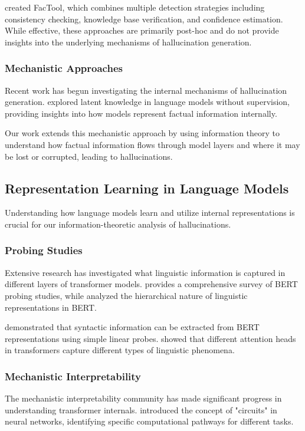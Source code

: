 \citet{chern2023factool} created FacTool, which combines multiple detection strategies including consistency checking, knowledge base verification, and confidence estimation. While effective, these approaches are primarily post-hoc and do not provide insights into the underlying mechanisms of hallucination generation.

\subsubsection{Mechanistic Approaches}
Recent work has begun investigating the internal mechanisms of hallucination generation. \citet{burns2023discovering} explored latent knowledge in language models without supervision, providing insights into how models represent factual information internally.

Our work extends this mechanistic approach by using information theory to understand how factual information flows through model layers and where it may be lost or corrupted, leading to hallucinations.

\subsection{Representation Learning in Language Models}
\label{subsec:repr_learning_lm}

Understanding how language models learn and utilize internal representations is crucial for our information-theoretic analysis of hallucinations.

\subsubsection{Probing Studies}
Extensive research has investigated what linguistic information is captured in different layers of transformer models. \citet{rogers2020primer} provides a comprehensive survey of BERT probing studies, while \citet{tenney2019bert} analyzed the hierarchical nature of linguistic representations in BERT.

\citet{hewitt2019structural} demonstrated that syntactic information can be extracted from BERT representations using simple linear probes. \citet{voita2019analyzing} showed that different attention heads in transformers capture different types of linguistic phenomena.

\subsubsection{Mechanistic Interpretability}
The mechanistic interpretability community has made significant progress in understanding transformer internals. \citet{olah2020zoom} introduced the concept of "circuits" in neural networks, identifying specific computational pathways for different tasks.

